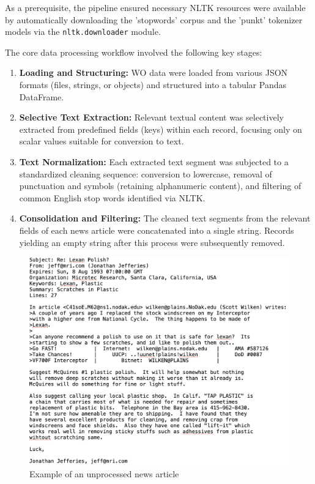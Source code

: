 As a prerequisite, the pipeline ensured necessary NLTK resources were available by automatically downloading the 'stopwords' corpus and the 'punkt' tokenizer models via the \verb|nltk.downloader| module.

The core data processing workflow involved the following key stages:

\begin{enumerate}
    \item \textbf{Loading and Structuring:} WO data were loaded from various JSON formats (files, strings, or objects) and structured into a tabular Pandas DataFrame.
    \item \textbf{Selective Text Extraction:} Relevant textual content was selectively extracted from predefined fields (keys) within each record, focusing only on scalar values suitable for conversion to text.
    \item \textbf{Text Normalization:} Each extracted text segment was subjected to a standardized cleaning sequence: conversion to lowercase, removal of punctuation and symbols (retaining alphanumeric content), and filtering of common English stop words identified via NLTK.
    \item \textbf{Consolidation and Filtering:} The cleaned text segments from the relevant fields of each news article were concatenated into a single string. Records yielding an empty string after this process were subsequently removed.
\end{enumerate}


\begin{figure}[h!]
    \centering
    \includegraphics[width=0.8\linewidth]{img/fig2.png}
    \caption{Example of an unprocessed news article}
    \label{fig:enter-label}
\end{figure}

